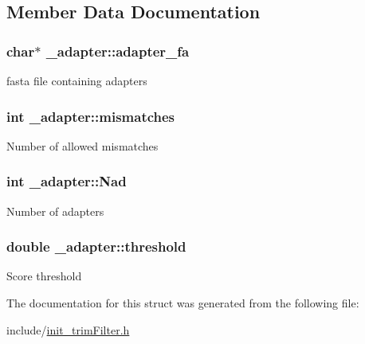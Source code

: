 \subsection{Member Data Documentation}
\hypertarget{struct__adapter_a8cce15db14580af09438241b8b5e0378}{
\subsubsection[{adapter\+\_\+fa}]{\setlength{\rightskip}{0pt plus 5cm}char$\ast$ \+\_\+adapter\+::adapter\+\_\+fa}}\label{struct__adapter_a8cce15db14580af09438241b8b5e0378}
fasta file containing adapters \hypertarget{struct__adapter_a51c6998b13837c66f79b3a1dd3c11995}{
\subsubsection[{mismatches}]{\setlength{\rightskip}{0pt plus 5cm}int \+\_\+adapter\+::mismatches}}\label{struct__adapter_a51c6998b13837c66f79b3a1dd3c11995}
Number of allowed mismatches \hypertarget{struct__adapter_aed006c3b66849e781049076b11f297d3}{
\subsubsection[{Nad}]{\setlength{\rightskip}{0pt plus 5cm}int \+\_\+adapter\+::\+Nad}}\label{struct__adapter_aed006c3b66849e781049076b11f297d3}
Number of adapters \hypertarget{struct__adapter_a2d1273cfaa0d51c79f331b92ed2342b4}{
\subsubsection[{threshold}]{\setlength{\rightskip}{0pt plus 5cm}double \+\_\+adapter\+::threshold}}\label{struct__adapter_a2d1273cfaa0d51c79f331b92ed2342b4}
Score threshold 

The documentation for this struct was generated from the following file\+:\begin{DoxyCompactItemize}
\item 
include/\hyperlink{init__trimFilter_8h}{init\+\_\+trim\+Filter.\+h}\end{DoxyCompactItemize}

